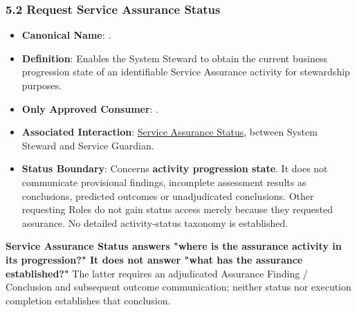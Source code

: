 \label{rad:assurance:175}
\subsubsection*{5.2 Request Service Assurance Status}
\label{rad:assurance:177}

\begin{itemize}

\item
\textbf{Canonical Name}: \texttt{}.



\item
\textbf{Definition}: Enables the System Steward to obtain the current business progression state of an identifiable Service Assurance activity for stewardship purposes.



\item
\textbf{Only Approved Consumer}: \texttt{}.



\item
\textbf{Associated Interaction}: \href{https://github.com/fhirfactory/harmonia/blob/98410db60155198a75f74c79d98060070209faa1/docs/markdown/03-business-architecture/collaborations-interactions/interactions.md\#service-assurance-status}{Service Assurance Status}, between System Steward and Service Guardian.



\item
\textbf{Status Boundary}: Concerns \textbf{activity progression state}. It does not communicate provisional findings, incomplete assessment results as conclusions, predicted outcomes or unadjudicated conclusions. Other requesting Roles do not gain status access merely because they requested assurance. No detailed activity-status taxonomy is established.



\end{itemize}
\label{rad:assurance:183}

\textbf{Service Assurance Status answers "where is the assurance activity in its progression?" It does not answer "what has the assurance established?"} The latter requires an adjudicated Assurance Finding /\allowbreak{} Conclusion and subsequent outcome communication; neither status nor execution completion establishes that conclusion.

\label{rad:assurance:185}

